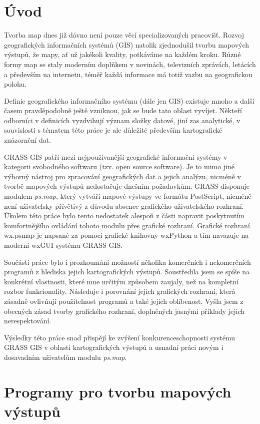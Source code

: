 \documentclass[a4paper,12pt,draft]{article}
\author{Anna Kratochvílová}
\newcommand{\modul}[1]{\emph{#1}}
\begin{document}
\tableofcontents
\renewcommand{\refname}{Použité zdroje}

\section{Úvod}
Tvorba map dnes již dávno není pouze věcí specializovaných
pracovišť. Rozvoj geografických informačních systémů (GIS) natolik
zjednodušil tvorbu mapových výstupů, že mapy, ať už jakékoli kvality,
potkáváme na každém kroku. Různé formy map se staly moderním doplňkem
v novinách, televizních zprávách, letácích a především na internetu,
téměř každá informace má totiž vazbu na geografickou polohu.

Definic geografického informačního systému (dále jen GIS) existuje mnoho
a další časem pravděpodobně ještě vzniknou, jak se bude tato oblast
vyvíjet. Někteří odborníci v definicích vyzdvihují význam složky
datové, jiní zas analytické, v souvislosti s tématem této práce je
ale důležité především kartografické znázornění dat.

GRASS GIS patří mezi nejpoužívanější geografické informační systémy v kategorii
svobodného softwaru (tzv. open source software). Je to mimo jiné výborný nástroj
pro zpracování geografických dat  a jejich analýzu, nicméně v tvorbě mapových
výstupů nedostačuje dnešním požadavkům. GRASS disponuje modulem \modul{ps.map}, který
vytváří mapové výstupy ve formátu PostScript, nicméně není uživatelsky
přívětivý z důvodu absence grafického uživatelského rozhraní. Úkolem této práce
bylo tento nedostatek alespoň z části napravit  poskytnutím
komfortnějšího ovládání tohoto modulu přes grafické rozhraní.
Grafické rozhraní wx.psmap je napsané za pomoci grafické knihovny wxPython a tím
navazuje na moderní wxGUI systému GRASS GIS.

Součástí práce bylo i prozkoumání možností několika komerčních i nekomerčních
programů z hlediska jejich kartografických výstupů. Soustředila jsem se spíše
na konkrétní vlastnosti, které mne určitým způsobem zaujaly, než na kompletní
rozbor funkcionality. Následuje i porovnání jejich grafických rozhraní, která
zásadně ovlivňují použitelnost programů a také jejich oblíbenost. Vyšla jsem z
obecných zásad tvorby grafického rozhraní, doplněných jasnými příklady jejich
nerespektování. 

Výsledky této práce snad přispějí ke zvýšení konkurenceschopnosti systému GRASS
GIS v oblasti kartografických výstupů a usnadní práci novým i dosavadním
uživatelům modulu \modul{ps.map}. 
\section{Programy pro tvorbu mapových výstupů}
\end{document}
